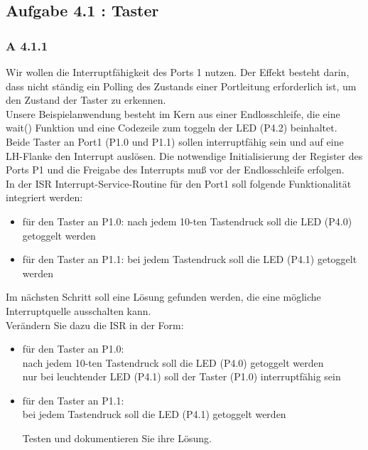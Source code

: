 \subsection*{Aufgabe 4.1 : Taster}

\subsubsection*{A 4.1.1}
	Wir wollen die Interruptfähigkeit des Ports 1 nutzen. Der Effekt besteht darin, dass nicht ständig ein Polling des Zustands einer Portleitung erforderlich ist, 
	um den Zustand der Taster zu erkennen.\\

	Unsere Beispielanwendung besteht im Kern aus einer Endlosschleife, die eine wait() Funktion und eine Codezeile zum toggeln der LED (P4.2) beinhaltet.\\

	Beide Taster an Port1 (P1.0 und P1.1) sollen interruptfähig sein und auf eine LH-Flanke den Interrupt auslösen. Die notwendige Initialisierung der Register 
	des Ports P1 und die Freigabe des Interrupts muß vor der Endlosschleife erfolgen.\\

	In der ISR Interrupt-Service-Routine für den Port1 soll folgende Funktionalität integriert werden:
	\begin{itemize}
		\item für den Taster an P1.0:
			nach jedem 10-ten Tastendruck soll die LED (P4.0) getoggelt werden
        		\item für den Taster an P1.1:
			bei jedem Tastendruck soll die LED (P4.1) getoggelt werden
	\end{itemize}
	Im nächsten Schritt soll eine Lösung gefunden werden, die eine mögliche Interruptquelle ausschalten kann.\\

	Verändern Sie dazu die ISR in der Form:
	\begin{itemize}
		\item für den Taster an P1.0:\\
        			nach jedem 10-ten Tastendruck soll die LED (P4.0) getoggelt werden\\
        			nur bei leuchtender LED (P4.1) soll der Taster (P1.0) interruptfähig sein\\
		\item für den Taster an P1.1:\\
			bei jedem Tastendruck soll die LED (P4.1) getoggelt werden

	Testen und dokumentieren Sie ihre Lösung.\\
	\end{itemize}

